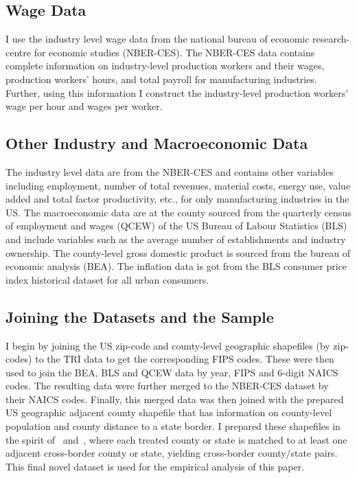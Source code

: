 \documentclass[12pt, english]{article}
\begin{document}
    \subsection{Wage Data}\label{subsec:wage-data}
    I use the industry level wage data from the national bureau of economic research-centre for economic studies (NBER-CES). The NBER-CES data contains complete information on industry-level production workers and their wages, production workers' hours, and total payroll for manufacturing industries. Further, using this information I construct the industry-level production workers' wage per hour and wages per worker.

    \subsection{Other Industry and Macroeconomic Data}\label{subsec:other-industry-and-macroeconomic-data}
    The industry level data are from the NBER-CES and contains other variables including employment, number of total revenues, material costs, energy use, value added and total factor productivity, etc., for only manufacturing industries in the US. The macroeconomic data are at the county sourced from the quarterly census of employment and wages (QCEW) of the US Bureau of Labour Statistics (BLS) and include variables such as the average number of establishments and industry ownership. The county-level gross domestic product is sourced from the bureau of economic analysis (BEA). The inflation data is got from the BLS consumer price index historical dataset for all urban consumers.

    \subsection{Joining the Datasets and the Sample}\label{subsec:joining-the-datasets-and-the-sample}
    I begin by joining the US zip-code and county-level geographic shapefiles (by zip-codes) to the TRI data to get the corresponding FIPS codes. These were then used to join the BEA, BLS and QCEW data by year, FIPS and $6$-digit NAICS codes. The resulting data were further merged to the NBER-CES dataset by their NAICS codes. Finally, this merged data was then joined with the prepared US geographic adjacent county shapefile that has information on county-level population and county distance to a state border. I prepared these shapefiles in the spirit of~\cite{dube2010minimum} and~\cite{gopalan2021state}, where each treated county or state is matched to at least one adjacent cross-border county or state, yielding cross-border county/state pairs. This final novel dataset is used for the empirical analysis of this paper.
\end{document}
